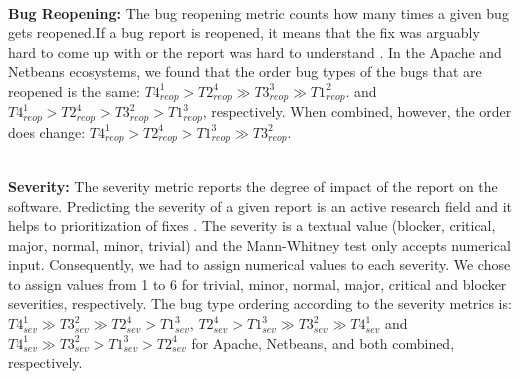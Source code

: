 \\ \vspace{0.1cm} {\bf Bug Reopening: }
The bug reopening metric counts how many times a given bug gets reopened.If a bug report is reopened, it means that the fix was arguably hard to come up with or the report was hard to understand \cite{Zimmermann2012}\cite{Shihab2010}\cite{Lo2013}.
In the Apache and Netbeans ecosystems, we found that the order bug types of the bugs that are reopened is the same:
$
T4_{reop}^1
 >
T2_{reop}^4
 \gg
T3_{reop}^3
 \gg
T1_{reop}^2
$.
and
$
T4_{reop}^1 >
T2_{reop}^4 >
T3_{reop}^2 >
T1_{reop}^3
$, respectively.
When combined, however, the order does change:
$
T4_{reop}^1
 >
T2_{reop}^4
 >
T1_{reop}^3
 \gg
T3_{reop}^2
$.

\\ \vspace{0.1cm} {\bf Severity: } The severity metric reports the degree of impact of the report on the software.
Predicting the severity of a given report is an active research field
\cite{Menzies2008,Guo2010,Lamkanfi2010,Tian2012,ValdiviaGarcia2014, Havelund2015} and it helps to prioritization of fixes \cite{Xuan2012}.
The severity is a textual value (blocker, critical, major, normal, minor, trivial) and the Mann-Whitney test only accepts numerical input.
Consequently, we had to assign numerical values to each severity.
We chose to assign values from 1 to 6 for trivial, minor, normal, major, critical and blocker severities, respectively.
The bug type ordering according to the severity metrics is:
$
T4_{sev}^1
 \gg
T3_{sev}^2
 \gg
T2_{sev}^4
 >
T1_{sev}^3
$,
$
T2_{sev}^4
>
T1_{sev}^3
 \gg
T3_{sev}^2
 \gg
T4_{sev}^1
$
and
$
T4_{sev}^1
 \gg
T3_{sev}^2
 >
T1_{sev}^3
 >
T2_{sev}^4
$
for Apache, Netbeans, and both combined, respectively.


